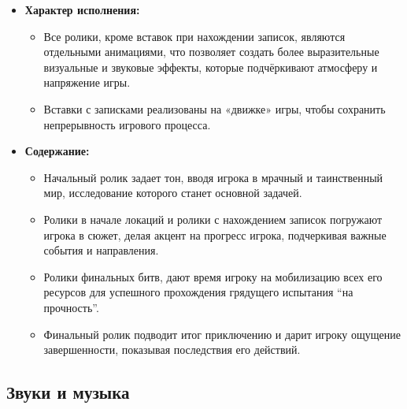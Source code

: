 \documentclass{article}
\begin{document}
\begin{itemize}
\item \textbf{Характер исполнения:}
    \begin{itemize}
        \item \textbf{}Все ролики, кроме вставок при нахождении записок, являются отдельными анимациями, что позволяет создать более выразительные визуальные и звуковые эффекты, которые подчёркивают атмосферу и напряжение игры.
        \item \textbf{}Вставки с записками реализованы на «движке» игры, чтобы сохранить непрерывность игрового процесса.
    \end{itemize}
\item \textbf{Содержание:}
    \begin{itemize}
        \item \textbf{}Начальный ролик задает тон, вводя игрока в мрачный и таинственный мир, исследование которого станет основной задачей. 
        \item \textbf{}Ролики в начале локаций и ролики с нахождением записок погружают игрока в сюжет, делая акцент на прогресс игрока, подчеркивая важные события и направления.
        \item \textbf{}Ролики финальных битв, дают время игроку на мобилизацию всех его ресурсов для успешного прохождения грядущего испытания “на прочность”.

        \item \textbf{}Финальный ролик подводит итог приключению и дарит игроку ощущение завершенности, показывая последствия его действий.
    \end{itemize}
\end{itemize}
\subsection{Звуки и музыка}
\end{document}
